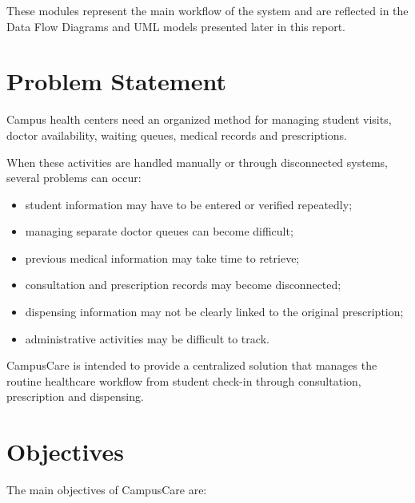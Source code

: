 \documentclass{tietreport}
\begin{document}
These modules represent the main workflow of the system and are
reflected in the Data Flow Diagrams and UML models presented later in
this report.

\section{Problem Statement}

Campus health centers need an organized method for managing student
visits, doctor availability, waiting queues, medical records and
prescriptions.

When these activities are handled manually or through disconnected
systems, several problems can occur:

\begin{itemize}
    \item student information may have to be entered or verified
    repeatedly;
    \item managing separate doctor queues can become difficult;
    \item previous medical information may take time to retrieve;
    \item consultation and prescription records may become
    disconnected;
    \item dispensing information may not be clearly linked to the
    original prescription;
    \item administrative activities may be difficult to track.
\end{itemize}

CampusCare is intended to provide a centralized solution that manages
the routine healthcare workflow from student check-in through
consultation, prescription and dispensing.

\section{Objectives}

The main objectives of CampusCare are:
\end{document}
